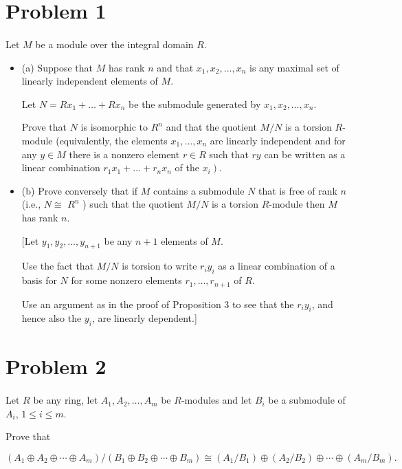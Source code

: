 \documentclass{article}
\begin{document}
\section*{Problem 1}\paragraph{}Let $M$ be a module over the integral domain $R$.
\begin{itemize}
    \item (a) Suppose that $M$ has rank $n$ and that $x_1, x_2, \ldots, x_n$ is any maximal set of linearly independent elements of $M$.

Let $N=R x_1+\ldots+R x_n$ be the submodule generated by $x_1, x_2, \ldots, x_n$.

Prove that $N$ is isomorphic to $R^n$ and that the quotient $M / N$ is a torsion $R$-module (equivalently, the elements $x_1, \ldots, x_n$ are linearly independent and for any $y \in M$ there is a nonzero element $r \in R$ such that $r y$ can be written as a linear combination $r_1 x_1+\ldots+r_n x_n$ of the $\left.x_i\right)$.

    \item (b) Prove conversely that if $M$ contains a submodule $N$ that is free of rank $n$ (i.e., $N \cong$ $R^n$ ) such that the quotient $M / N$ is a torsion $R$-module then $M$ has rank $n$.

[Let $y_1, y_2, \ldots, y_{n+1}$ be any $n+1$ elements of $M$.

Use the fact that $M / N$ is torsion to write $r_i y_i$ as a linear combination of a basis for $N$ for some nonzero elements $r_1, \ldots, r_{n+1}$ of $R$.

Use an argument as in the proof of Proposition 3 to see that the $r_i y_i$, and hence also the $y_i$, are linearly dependent.]

\end{itemize}

\section*{Problem 2}\paragraph{}Let $R$ be any ring, let $A_1, A_2, \ldots, A_m$ be $R$-modules and let $B_i$ be a submodule of $A_i$, $1 \leq i \leq m$.

Prove that

$$
\left(A_1 \oplus A_2 \oplus \cdots \oplus A_m\right) /\left(B_1 \oplus B_2 \oplus \cdots \oplus B_m\right) \cong\left(A_1 / B_1\right) \oplus\left(A_2 / B_2\right) \oplus \cdots \oplus\left(A_m / B_m\right) \text {.
}
$$
\end{document}
